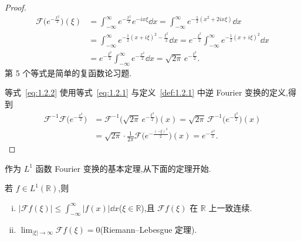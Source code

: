 \begin{proof}
\begin{align*}
\mathcal{F}\bigl(e^{-\frac{x^{2}}{2}}\bigr)(\xi) & = \int_{-\infty}^{\infty} e^{-\frac{x^{2}}{2}}e^{-ix\xi}\dd x = \int_{-\infty}^{\infty} e^{-\frac{1}{2}(x^{2} + 2ix\xi)}\dd x \\
& = \int_{-\infty}^{\infty} e^{-\frac{1}{2}(x + i\xi)^{2} - \frac{\xi^{2}}{2}}\dd x = e^{-\frac{\xi^{2}}{2}}\int_{-\infty}^{\infty} e^{-\frac{1}{2}(x + i\xi)^{2}}\dd x \\
& = e^{-\frac{\xi^{2}}{2}}\int_{-\infty}^{\infty} e^{-\frac{x^{2}}{2}}\dd x = \sqrt{2\pi}\,e^{-\frac{\xi^{2}}{2}}.
\end{align*}
第 5 个等式是简单的复函数论习题.

等式~\eqref{eq:1.2.2} 使用等式~\eqref{eq:1.2.1} 与定义~\ref{def:1.2.1} 中逆 Fourier 变换的定义,得到
\begin{equation*}
\begin{aligned}
\mathcal{F}^{-1}\mathcal{F}\bigl(e^{-\frac{x^{2}}{2}}\bigr) &= \mathcal{F}^{-1}\bigl(\sqrt{2\pi}\,e^{-\frac{\xi^{2}}{2}}\bigr)(x) = \sqrt{2\pi}\,\mathcal{F}^{-1}\bigl(e^{-\frac{\xi^{2}}{2}}\bigr)(x) \\
&= \sqrt{2\pi}\cdot\frac{1}{2\pi}\mathcal{F}\bigl(e^{-\frac{(-\xi)^{2}}{2}}\bigr)(x) = e^{-\frac{x^{2}}{2}}.
\end{aligned}
\end{equation*}
\end{proof}

作为 $L^{1}$ 函数 Fourier 变换的基本定理,从下面的定理开始.

\begin{theorem}\label{thm:1.2.3}
若 $f \in L^{1}(\mathbb{R})$,则
\begin{enumerate}[(i)]
\item $|\mathcal{F}f(\xi)| \leq \int_{-\infty}^{\infty}|f(x)|\dd x$($\xi \in \mathbb{R}$),且 $\mathcal{F}f(\xi)$ 在 $\mathbb{R}$ 上一致连续.
\item $\lim_{|\xi| \to \infty}\mathcal{F}f(\xi) = 0$(Riemann--Lebesgue 定理).
\end{enumerate}
\end{theorem}

